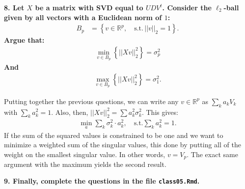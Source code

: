 \documentclass[12pt,hidelinks]{article}
\numberwithin{equation}{section}
\begin{document}
\textbf{8. Let $X$ be a matrix with SVD equal to $UDV^t$. Consider the $\ell_2$-ball
given by all vectors with a Euclidean norm of $1$:}
\begin{align}
B_p &= \left\{ v \in \mathbb{R}^p, \quad \text{s.t.} \, ||v||_2 = 1 \right\}.
\end{align}
\textbf{Argue that:}
\begin{align}
\min_{v \in B_p} \left\{ || X v ||_2^2 \right\} = \sigma_p^2
\end{align}
\textbf{And}
\begin{align}
\max_{v \in B_p} \left\{ || X v ||_2^2 \right\} = \sigma_1^2.
\end{align}

\vspace*{12pt}

Putting together the previous questions, we can write any $v \in \mathbb{R}^p$ as
$\sum_k a_k V_k$ with $\sum_k a_k^2 = 1$. Also, then, $|| X v ||_2^2 = \sum a_k^2 \sigma_k^2$.
This gives:
\begin{align}
\min_a \sum_k \sigma_k^2 \cdot a_k^2, \quad \text{s.t.} \sum_k a_k^2 = 1.
\end{align}
If the sum of the squared values is constrained to be one and we want to minimize
a weighted sum of the singular values, this done by putting all of the weight on
the smallest singular value. In other words, $v = V_p$. The exact same argument
with the maximum yields the second result.

\vspace*{12pt}

\textbf{9. Finally, complete the questions in the file \texttt{class05.Rmd}.}

\vspace*{12pt}
\end{document}
